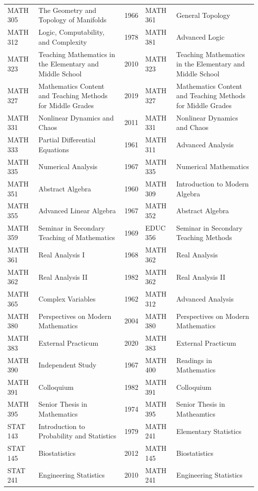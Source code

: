 \documentclass[
]{book}
\begin{document}
\begin{table}
\begin{tabular}[t]{llrll}
MATH 305 & The Geometry and Topology of Manifolds & 1966 & MATH 361 & General Topology\\
MATH 312 & Logic, Computability, and Complexity & 1978 & MATH 381 & Advanced Logic\\
MATH 323 & Teaching Mathematics in the Elementary and Middle School & 2010 & MATH 323 & Teaching Mathematics in the Elementary and Middle School\\
MATH 327 & Mathematics Content and Teaching Methods for Middle Grades & 2019 & MATH 327 & Mathematics Content and Teaching Methods for Middle Grades\\
\addlinespace
MATH 331 & Nonlinear Dynamics and Chaos & 2011 & MATH 331 & Nonlinear Dynamics and Chaos\\
MATH 333 & Partial Differential Equations & 1961 & MATH 311 & Advanced Analysis\\
MATH 335 & Numerical Analysis & 1967 & MATH 335 & Numerical Mathematics\\
MATH 351 & Abstract Algebra & 1960 & MATH 309 & Introduction to Modern Algebra\\
MATH 355 & Advanced Linear Algebra & 1967 & MATH 352 & Abstract Algebra\\
\addlinespace
MATH 359 & Seminar in Secondary Teaching of Mathematics & 1969 & EDUC 356 & Seminar in Secondary Teaching Methods\\
MATH 361 & Real Analysis I & 1968 & MATH 362 & Real Analysis\\
MATH 362 & Real Analysis II & 1982 & MATH 362 & Real Analysis II\\
MATH 365 & Complex Variables & 1962 & MATH 312 & Advanced Analysis\\
MATH 380 & Perspectives on Modern Mathematics & 2004 & MATH 380 & Perspectives on Modern Mathematics\\
\addlinespace
MATH 383 & External Practicum & 2020 & MATH 383 & External Practicum\\
MATH 390 & Independent Study & 1967 & MATH 400 & Readings in Mathematics\\
MATH 391 & Colloquium & 1982 & MATH 391 & Colloquium\\
MATH 395 & Senior Thesis in Mathematics & 1974 & MATH 395 & Senior Thesis in Matheamtics\\
STAT 143 & Introduction to Probability and Statistics & 1979 & MATH 241 & Elementary Statistics\\
\addlinespace
STAT 145 & Biostatistics & 2012 & MATH 145 & Biostatistics\\
STAT 241 & Engineering Statistics & 2010 & MATH 241 & Engineering Statistics\\

\end{tabular}
\end{table}
\end{document}
